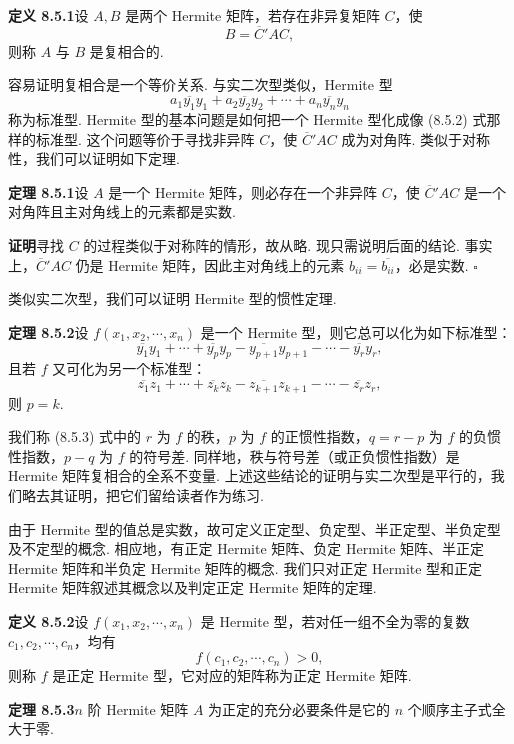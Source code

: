 \documentclass[UTF8, 12pt, fontset=fandol, oneside]{ctexart}
\begin{document}
\noindent\textbf{定义 8.5.1}\quad 设 $A,B$ 是两个 Hermite 矩阵，若存在非异复矩阵 $C$，使
\[
B=\overline{C}'AC,
\]
则称 $A$ 与 $B$ 是复相合的.

容易证明复相合是一个等价关系. 与实二次型类似，Hermite 型
\begin{equation}
a_1\overline{y_1}y_1+a_2\overline{y_2}y_2+\cdots+a_n\overline{y_n}y_n
\tag{8.5.2}
\end{equation}
称为标准型. Hermite 型的基本问题是如何把一个 Hermite 型化成像 (8.5.2) 式那样的标准型. 这个问题等价于寻找非异阵 $C$，使 $\overline{C}'AC$ 成为对角阵. 类似于对称性，我们可以证明如下定理.

\noindent\textbf{定理 8.5.1}\quad 设 $A$ 是一个 Hermite 矩阵，则必存在一个非异阵 $C$，使 $\overline{C}'AC$ 是一个对角阵且主对角线上的元素都是实数.

\noindent\textbf{证明}\quad 寻找 $C$ 的过程类似于对称阵的情形，故从略. 现只需说明后面的结论. 事实上，$\overline{C}'AC$ 仍是 Hermite 矩阵，因此主对角线上的元素 $b_{ii}=\overline{b_{ii}}$，必是实数. $\square$

类似实二次型，我们可以证明 Hermite 型的惯性定理.

\noindent\textbf{定理 8.5.2}\quad 设 $f(x_1,x_2,\cdots,x_n)$ 是一个 Hermite 型，则它总可以化为如下标准型：
\begin{equation}
\overline{y_1}y_1+\cdots+\overline{y_p}y_p-\overline{y_{p+1}}y_{p+1}-\cdots-\overline{y_r}y_r,
\tag{8.5.3}
\end{equation}
且若 $f$ 又可化为另一个标准型：
\[
\overline{z_1}z_1+\cdots+\overline{z_k}z_k-\overline{z_{k+1}}z_{k+1}-\cdots-\overline{z_r}z_r,
\]
则 $p=k$.

我们称 (8.5.3) 式中的 $r$ 为 $f$ 的秩，$p$ 为 $f$ 的正惯性指数，$q=r-p$ 为 $f$ 的负惯性指数，$p-q$ 为 $f$ 的符号差. 同样地，秩与符号差（或正负惯性指数）是 Hermite 矩阵复相合的全系不变量. 上述这些结论的证明与实二次型是平行的，我们略去其证明，把它们留给读者作为练习.

由于 Hermite 型的值总是实数，故可定义正定型、负定型、半正定型、半负定型及不定型的概念. 相应地，有正定 Hermite 矩阵、负定 Hermite 矩阵、半正定 Hermite 矩阵和半负定 Hermite 矩阵的概念. 我们只对正定 Hermite 型和正定 Hermite 矩阵叙述其概念以及判定正定 Hermite 矩阵的定理.

\noindent\textbf{定义 8.5.2}\quad 设 $f(x_1,x_2,\cdots,x_n)$ 是 Hermite 型，若对任一组不全为零的复数 $c_1,c_2,\cdots,c_n$，均有
\[
f(c_1,c_2,\cdots,c_n)>0,
\]
则称 $f$ 是正定 Hermite 型，它对应的矩阵称为正定 Hermite 矩阵.

\noindent\textbf{定理 8.5.3}\quad $n$ 阶 Hermite 矩阵 $A$ 为正定的充分必要条件是它的 $n$ 个顺序主子式全大于零.
\end{document}

